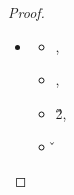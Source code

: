 \begin{lemma}
\begin{proof}
\begin{case}[T-App]









\begin{itemize}
  \item[]
\begin{subcase}[B-BetaClosure]
  \begin{itemize}
    \item
  \opsem{\openv{}}{\e{}}{\v{}},
    \item
  \opsem {\openv{}}
         {}
         { {\abs {\x{}} {\s{}} {}}},
    \item
  \opsem {\openv{}}
         {}
         {\v{2}},
    \item
         {}
         {\v{}}
     \end{itemize}


\end{subcase}
\end{itemize}
\end{case}
\end{proof}
\end{lemma}
